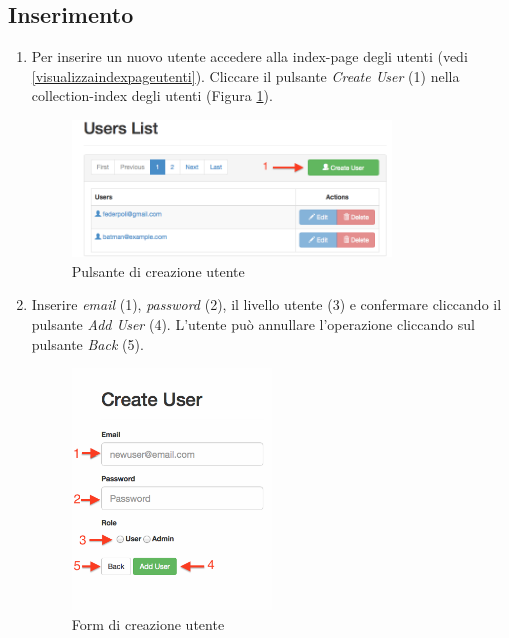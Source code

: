 	\clearpage
	\subsection{Inserimento} %
	\label{utenti-inserimento}
		\begin{enumerate}

			\item Per inserire un nuovo utente accedere alla index-page degli utenti (vedi \ref{visualizzaindexpageutenti}). Cliccare il pulsante \emph{Create User} (1) nella collection-index degli utenti (Figura \ref{fig:createuserButton}).
				\begin{figure}[H]
					\centering \includegraphics[width=0.8\textwidth]{img/createuserButton.png}
					\caption{ \label{fig:createuserButton} Pulsante di creazione utente}
				\end{figure}

			\item Inserire \emph{email} (1), \emph{password} (2), il livello utente (3) e confermare cliccando il pulsante \emph{Add User} (4). L'utente può annullare l'operazione cliccando sul pulsante \emph{Back} (5).

				\begin{figure}[H]
					\centering \includegraphics[width=0.5\textwidth]{img/formCreazioneUtente.png}
					\caption{ \label{fig:formCreazioneUtente} Form di creazione utente}
				\end{figure}


\end{enumerate}
